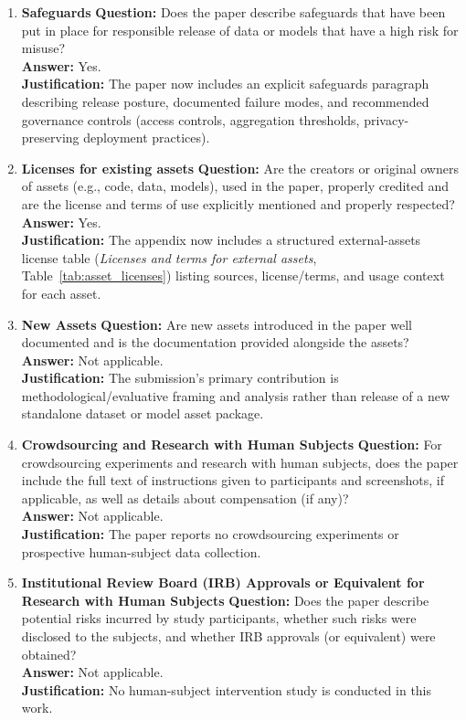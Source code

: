 \begin{enumerate}
\item \textbf{Safeguards}
\textbf{Question:} Does the paper describe safeguards that have been put in place for responsible release of data or models that have a high risk for misuse?\\
\textbf{Answer:} Yes.\\
\textbf{Justification:} The paper now includes an explicit safeguards paragraph describing release posture, documented failure modes, and recommended governance controls (access controls, aggregation thresholds, privacy-preserving deployment practices).

\item \textbf{Licenses for existing assets}
\textbf{Question:} Are the creators or original owners of assets (e.g., code, data, models), used in the paper, properly credited and are the license and terms of use explicitly mentioned and properly respected?\\
\textbf{Answer:} Yes.\\
\textbf{Justification:} The appendix now includes a structured external-assets license table (\emph{Licenses and terms for external assets}, Table~\ref{tab:asset_licenses}) listing sources, license/terms, and usage context for each asset.

\item \textbf{New Assets}
\textbf{Question:} Are new assets introduced in the paper well documented and is the documentation provided alongside the assets?\\
\textbf{Answer:} Not applicable.\\
\textbf{Justification:} The submission's primary contribution is methodological/evaluative framing and analysis rather than release of a new standalone dataset or model asset package.

\item \textbf{Crowdsourcing and Research with Human Subjects}
\textbf{Question:} For crowdsourcing experiments and research with human subjects, does the paper include the full text of instructions given to participants and screenshots, if applicable, as well as details about compensation (if any)?\\
\textbf{Answer:} Not applicable.\\
\textbf{Justification:} The paper reports no crowdsourcing experiments or prospective human-subject data collection.

\item \textbf{Institutional Review Board (IRB) Approvals or Equivalent for Research with Human Subjects}
\textbf{Question:} Does the paper describe potential risks incurred by study participants, whether such risks were disclosed to the subjects, and whether IRB approvals (or equivalent) were obtained?\\
\textbf{Answer:} Not applicable.\\
\textbf{Justification:} No human-subject intervention study is conducted in this work.

\end{enumerate}
